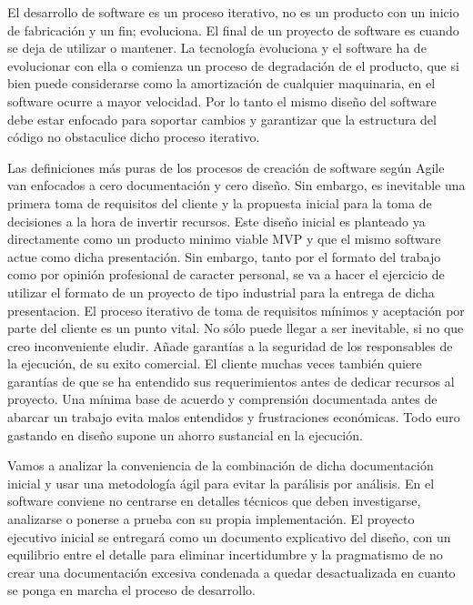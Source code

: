 
El desarrollo de software es un proceso iterativo, no es un producto con un inicio de fabricación y un fin; evoluciona. El final de un proyecto de software es cuando se deja de utilizar o mantener. La tecnología evoluciona y el software ha de evolucionar con ella o comienza un proceso de degradación de el producto, que si bien puede considerarse como la amortización de cualquier maquinaria, en el software ocurre a mayor velocidad. Por lo tanto el mismo diseño del software debe estar enfocado para soportar cambios y garantizar que la estructura del código no obstaculice dicho proceso iterativo.

Las definiciones más puras de los procesos de creación de software según Agile van enfocados a cero documentación y cero diseño. Sin embargo, es inevitable una primera toma de requisitos del cliente y la propuesta inicial para la toma de decisiones a la hora de invertir recursos. Este diseño inicial es planteado ya directamente como un producto minimo viable MVP y que el mismo software actue como dicha presentación. Sin embargo, tanto por el formato del trabajo como por opinión profesional de caracter personal, se va a hacer el ejercicio de utilizar el formato de un proyecto de tipo industrial para la entrega de dicha presentacion. El proceso iterativo de toma de requisitos mínimos y aceptación por parte del cliente es un punto vital. No sólo puede llegar a ser inevitable, si no que creo inconveniente eludir. Añade garantías a la seguridad de los responsables de la ejecución, de su exito comercial. El cliente muchas veces también quiere garantías de que se ha entendido sus requerimientos antes de dedicar recursos al proyecto. Una mínima base de acuerdo y comprensión documentada antes de abarcar un trabajo evita malos entendidos y frustraciones económicas. Todo euro gastando en diseño supone un ahorro sustancial en la ejecución.

Vamos a analizar la conveniencia de la combinación de dicha documentación inicial y usar una metodología ágil para evitar la parálisis por análisis. En el software conviene no centrarse en detalles técnicos que deben investigarse, analizarse o ponerse a prueba con su propia implementación. El proyecto ejecutivo inicial se entregará como un documento explicativo del diseño, con un equilibrio entre el detalle para eliminar incertidumbre y la pragmatismo de no crear una documentación excesiva condenada a quedar desactualizada en cuanto se ponga en marcha el proceso de desarrollo.

